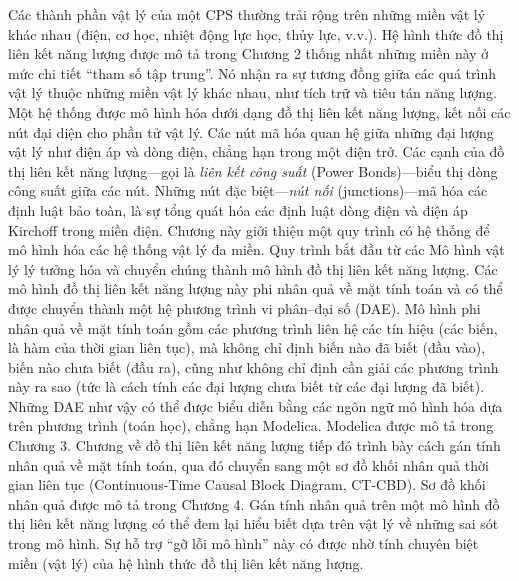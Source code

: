 Các thành phần vật lý của một CPS thường trải rộng trên những miền vật lý khác nhau (điện, cơ học, nhiệt động lực học, thủy lực, v.v.). Hệ hình thức đồ thị liên kết năng lượng được mô tả trong Chương 2 thống nhất những miền này ở mức chi tiết ``tham số tập trung''. Nó nhận ra sự tương đồng giữa các quá trình vật lý thuộc những miền vật lý khác nhau, như tích trữ và tiêu tán năng lượng. Một hệ thống được mô hình hóa dưới dạng đồ thị liên kết năng lượng, kết nối các nút đại diện cho phần tử vật lý. Các nút mã hóa quan hệ giữa những đại lượng vật lý như điện áp và dòng điện, chẳng hạn trong một điện trở. Các cạnh của đồ thị liên kết năng lượng---gọi là \emph{liên kết công suất} (Power Bonds)---biểu thị dòng công suất giữa các nút. Những nút đặc biệt---\emph{nút nối} (junctions)---mã hóa các định luật bảo toàn, là sự tổng quát hóa các định luật dòng điện và điện áp Kirchoff trong miền điện. Chương này giới thiệu một quy trình có hệ thống để mô hình hóa các hệ thống vật lý đa miền. Quy trình bắt đầu từ các Mô hình vật lý lý tưởng hóa và chuyển chúng thành mô hình đồ thị liên kết năng lượng. Các mô hình đồ thị liên kết năng lượng này phi nhân quả về mặt tính toán và có thể được chuyển thành một hệ phương trình vi phân--đại số (DAE). Mô hình phi nhân quả về mặt tính toán gồm các phương trình liên hệ các tín hiệu (các biến, là hàm của thời gian liên tục), mà không chỉ định biến nào đã biết (đầu vào), biến nào chưa biết (đầu ra), cũng như không chỉ định cần giải các phương trình này ra sao (tức là cách tính các đại lượng chưa biết từ các đại lượng đã biết). Những DAE như vậy có thể được biểu diễn bằng các ngôn ngữ mô hình hóa dựa trên phương trình (toán học), chẳng hạn Modelica. Modelica được mô tả trong Chương 3. Chương về đồ thị liên kết năng lượng tiếp đó trình bày cách gán tính nhân quả về mặt tính toán, qua đó chuyển sang một sơ đồ khối nhân quả thời gian liên tục (Continuous-Time Causal Block Diagram, CT-CBD). Sơ đồ khối nhân quả được mô tả trong Chương 4. Gán tính nhân quả trên một mô hình đồ thị liên kết năng lượng có thể đem lại hiểu biết dựa trên vật lý về những sai sót trong mô hình. Sự hỗ trợ ``gỡ lỗi mô hình'' này có được nhờ tính chuyên biệt miền (vật lý) của hệ hình thức đồ thị liên kết năng lượng.

